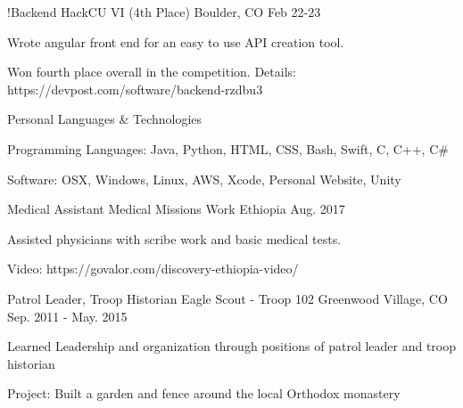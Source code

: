 \vspace{-2.0mm}

\begin{cventries}
\cventry
    {!Backend} %
    {HackCU VI (4th Place)} %
    {Boulder, CO} %
    {Feb 22-23} %
    {
    \begin{cvitems} %
        \item {Wrote angular front end for an easy to use API creation tool.}
        \item {Won fourth place overall in the competition. Details: https://devpost.com/software/backend-rzdbu3}
        \end{cvitems}
    }

  \cventry
    {Personal} %
    {Languages \& Technologies} %
    {} %
    {} %
    {
      \begin{cvitems} %
        \item {Programming Languages: Java, Python, HTML, CSS, Bash, Swift, C, C++, C\#}
        \item {Software: OSX, Windows, Linux, AWS, Xcode, Personal Website, Unity}
      \end{cvitems}
    }

\cventry
    {Medical Assistant} %
    {Medical Missions Work} %
    {Ethiopia} %
    {Aug. 2017} %
    {
      \begin{cvitems} %
        \item {Assisted physicians with scribe work and basic medical tests.}
        \item {Video: https://govalor.com/discovery-ethiopia-video/}
      \end{cvitems}
    }
\cventry
    {Patrol Leader, Troop Historian} %
    {Eagle Scout - Troop 102} %
    {Greenwood Village, CO} %
    {Sep. 2011 - May. 2015} %
    {
    \begin{cvitems} %
        \item {Learned Leadership and organization through positions of patrol leader and troop historian}
        \item {Project: Built a garden and fence around the local Orthodox monastery}
    \end{cvitems}
    }

\end{cventries}
